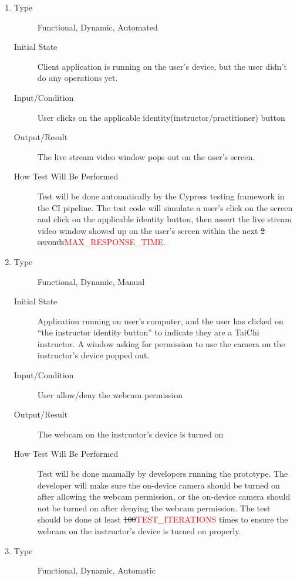 \documentclass[12pt, titlepage]{article}
\newcommand{\rt}[1]{\textcolor{red}{#1}}
\begin{document}
\begin{enumerate}[FR-T1]
\item \label{FRT1}
  \begin{description}
  \item[Type] Functional, Dynamic, Automated
  \item[Initial State] Client application is running on the user's device, but the
    user didn’t do any operations yet.
  \item[Input/Condition] User clicks on the applicable
    identity(instructor/practitioner) button
  \item[Output/Result] The live stream video window pops out on the user's screen.
  \item[How Test Will Be Performed] Test will be done automatically by the Cypress
    testing framework in the CI pipeline. The test code will simulate a user's
    click on the screen and click on the applicable identity button, then assert
    the live stream video window showed up on the user's screen within the next
    \sout{2 seconds}\rt{MAX\_RESPONSE\_TIME}.
  \end{description}
\item \label{FRT2}
  \begin{description}
  \item[Type] Functional, Dynamic, Manual
  \item[Initial State] Application running on user’s computer, and the user has
    clicked on “the instructor identity button” to indicate they are a TaiChi
    instructor. A window asking for permission to use the camera on the
    instructor's device popped out.
  \item[Input/Condition] User allow/deny the webcam permission
  \item[Output/Result] The webcam on the instructor’s device is turned on
  \item[How Test Will Be Performed] Test will be done manually by developers
    running the prototype. The developer will make sure the on-device camera
    should be turned on after allowing the webcam permission, or the on-device
    camera should not be turned on after denying the webcam permission. The test
    should be done at least \sout{100}\rt{TEST\_ITERATIONS} times to ensure the webcam on the instructor’s
    device is turned on properly.
  \end{description}
\item \label{FRT3}
  \begin{description}
  \item[Type] Functional, Dynamic, Automatic

\end{description}
\end{enumerate}
\end{document}

